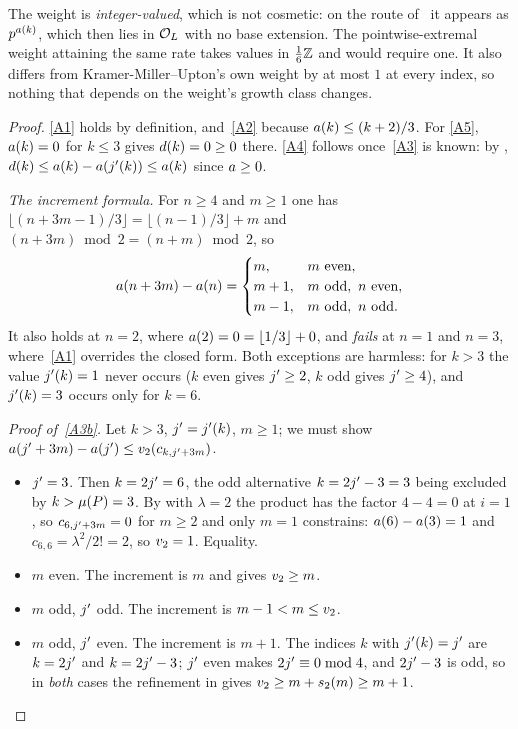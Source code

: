 The weight is \emph{integer-valued}, which is not cosmetic: on the route of~\cite{kramermiller2020abelian} it appears as $p^{a(k)}$, which then lies
in $\mathcal{O}_L$ with no base extension. The pointwise-extremal weight attaining the
same rate takes values in $\tfrac16\mathbb{Z}$ and would require one. It also
differs from Kramer-Miller--Upton's own weight by at most $1$ at every
index, so nothing that depends on the weight's growth class changes.

\begin{proof}
\ref{A1} holds by definition, and~\ref{A2} because $a(k) \le (k+2)/3$. For
\ref{A5}, $a(k) = 0$ for $k \le 3$ gives $d(k) = 0 \ge 0$ there.
\ref{A4} follows once~\ref{A3} is known: by ,
$d(k) \le a(k) - a(j'(k)) \le a(k)$ since $a \ge 0$.

\emph{The increment formula.} For $n \ge 4$ and $m \ge 1$ one has
$\lfloor (n+3m-1)/3 \rfloor = \lfloor (n-1)/3 \rfloor + m$ and $(n+3m)
\bmod 2 = (n+m) \bmod 2$, so
\begin{equation}
\label{eq:increment}
  a(n+3m) - a(n) =
  \begin{cases}
    m, & m \text{ even},\\
    m+1, & m \text{ odd},\ n \text{ even},\\
    m-1, & m \text{ odd},\ n \text{ odd}.
  \end{cases}
\end{equation}
It also holds at $n = 2$, where $a(2) = 0 = \lfloor 1/3 \rfloor + 0$, and
\emph{fails} at $n = 1$ and $n = 3$, where~\ref{A1} overrides the closed
form. Both exceptions are harmless: for $k > 3$ the value $j'(k) = 1$ never
occurs ($k$ even gives $j' \ge 2$, $k$ odd gives $j' \ge 4$), and $j'(k)
= 3$ occurs only for $k = 6$.

\emph{Proof of~\ref{A3b}.} Let $k > 3$, $j' = j'(k)$, $m \ge 1$; we must
show $a(j'+3m) - a(j') \le v_2(c_{k,j'+3m})$.
\begin{itemize}[leftmargin=*,itemsep=2pt]
\item $j' = 3$. Then $k = 2j' = 6$, the odd alternative $k = 2j' - 3 = 3$
  being excluded by $k > \mu(P) = 3$. By  with $\lambda
  = 2$ the product has the factor $4-4 = 0$ at $i = 1$, so $c_{6,j'+3m} =
  0$ for $m \ge 2$ and only $m = 1$ constrains: $a(6) - a(3) = 1$ and
  $c_{6,6} = \lambda^2/2! = 2$, so $v_2 = 1$. Equality.
\item $m$ even. The increment is $m$ and  gives $v_2 \ge
  m$.
\item $m$ odd, $j'$ odd. The increment is $m-1 < m \le v_2$.
\item $m$ odd, $j'$ even. The increment is $m+1$. The indices $k$ with
  $j'(k) = j'$ are $k = 2j'$ and $k = 2j' - 3$; $j'$ even makes $2j'
  \equiv 0 \bmod 4$, and $2j' - 3$ is odd, so in \emph{both} cases the
  refinement in  gives $v_2 \ge m + s_2(m) \ge m+1$.
\end{itemize}


\end{proof}
